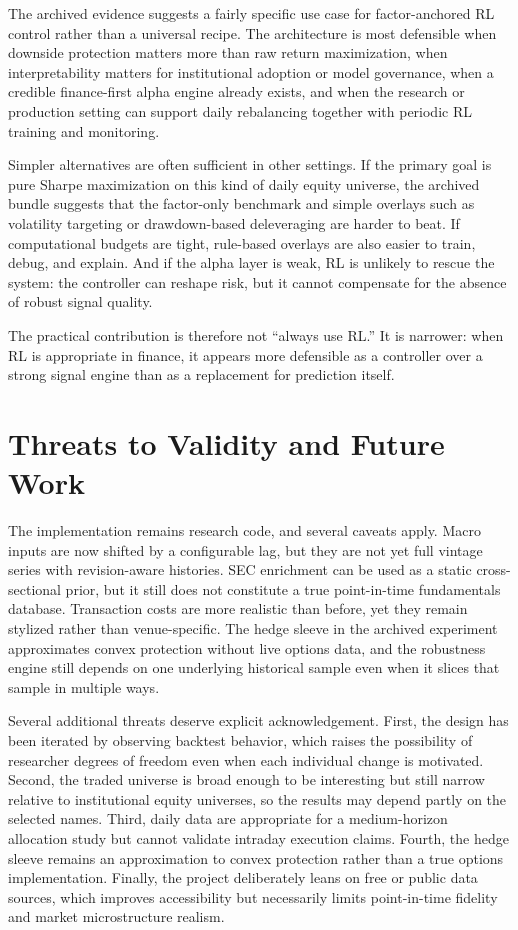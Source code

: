 \documentclass[10pt,twocolumn]{article}
\begin{document}
The archived evidence suggests a fairly specific use case for factor-anchored RL
control rather than a universal recipe. The architecture is most defensible when
downside protection matters more than raw return maximization, when
interpretability matters for institutional adoption or model governance, when a
credible finance-first alpha engine already exists, and when the research or
production setting can support daily rebalancing together with periodic RL
training and monitoring.

Simpler alternatives are often sufficient in other settings. If the primary goal
is pure Sharpe maximization on this kind of daily equity universe, the archived
bundle suggests that the factor-only benchmark and simple overlays such as
volatility targeting or drawdown-based deleveraging are harder to beat. If
computational budgets are tight, rule-based overlays are also easier to train,
debug, and explain. And if the alpha layer is weak, RL is unlikely to rescue the
system: the controller can reshape risk, but it cannot compensate for the
absence of robust signal quality.

The practical contribution is therefore not ``always use RL.'' It is narrower:
when RL is appropriate in finance, it appears more defensible as a controller
over a strong signal engine than as a replacement for prediction itself.

\section{Threats to Validity and Future Work}

The implementation remains research code, and several caveats apply. Macro inputs
are now shifted by a configurable lag, but they are not yet full vintage series
with revision-aware histories. SEC enrichment can be used as a static
cross-sectional prior, but it still does not constitute a true point-in-time
fundamentals database. Transaction costs are more realistic than before, yet
they remain stylized rather than venue-specific. The hedge sleeve in the
archived experiment approximates convex protection without live options data,
and the robustness engine still depends on one underlying historical sample even
when it slices that sample in
multiple ways.

Several additional threats deserve explicit acknowledgement. First, the design
has been iterated by observing backtest behavior, which raises the possibility
of researcher degrees of freedom even when each individual change is motivated.
Second, the traded universe is broad enough to be interesting but still narrow
relative to institutional equity universes, so the results may depend partly on
the selected names. Third, daily data are appropriate for a medium-horizon
allocation study but cannot validate intraday execution claims. Fourth, the
hedge sleeve remains an approximation to convex protection rather than a true
options implementation. Finally, the project deliberately leans on free or
public data sources, which improves accessibility but necessarily limits
point-in-time fidelity and market microstructure realism.
\end{document}
